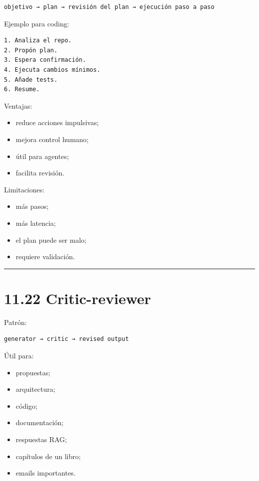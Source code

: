 \begin{lstlisting}
objetivo → plan → revisión del plan → ejecución paso a paso
\end{lstlisting}

Ejemplo para coding:

\begin{lstlisting}
1. Analiza el repo.
2. Propón plan.
3. Espera confirmación.
4. Ejecuta cambios mínimos.
5. Añade tests.
6. Resume.
\end{lstlisting}

Ventajas:

\begin{itemize}
\tightlist
\item
  reduce acciones impulsivas;
\item
  mejora control humano;
\item
  útil para agentes;
\item
  facilita revisión.
\end{itemize}

Limitaciones:

\begin{itemize}
\tightlist
\item
  más pasos;
\item
  más latencia;
\item
  el plan puede ser malo;
\item
  requiere validación.
\end{itemize}

\begin{center}\rule{0.5\linewidth}{0.5pt}\end{center}

\section{11.22 Critic-reviewer}\label{critic-reviewer}

Patrón:

\begin{lstlisting}
generator → critic → revised output
\end{lstlisting}

Útil para:

\begin{itemize}
\tightlist
\item
  propuestas;
\item
  arquitectura;
\item
  código;
\item
  documentación;
\item
  respuestas RAG;
\item
  capítulos de un libro;
\item
  emails importantes.
\end{itemize}

